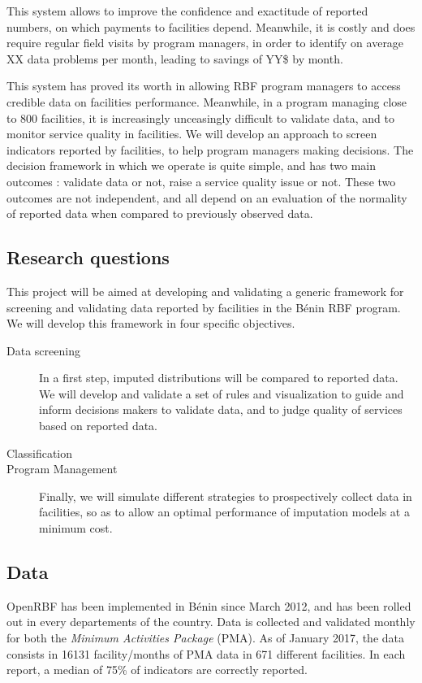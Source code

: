 This system allows to improve the confidence and exactitude of reported numbers, on which payments to facilities depend. Meanwhile, it is costly and does require regular field visits by program managers, in order to identify on average XX data problems per month, leading to savings of YY\$ by month.

This system has proved its worth in allowing RBF program managers to access credible data on facilities performance. Meanwhile, in a program managing close to 800 facilities, it is increasingly unceasingly difficult to validate data, and to monitor service quality in facilities. We will develop an approach to screen indicators reported by facilities, to help program managers making decisions. The decision framework in which we operate is quite simple, and has two main outcomes : validate data or not, raise a service quality issue or not. These two outcomes are not independent, and all depend on an evaluation of the normality of reported data when compared to previously observed data.

\subsection{Research questions}

This project will be aimed at developing and validating a generic framework for screening and validating data reported by facilities in the Bénin RBF program. We will develop this framework in four specific objectives.

\begin{description}
	\item[Data screening] In a first step, imputed distributions will be compared to reported data. We will develop and validate a set of rules and visualization to guide and inform decisions makers to validate data, and to judge quality of services based on reported data.
	\item[Classification]
	\item[Program Management] Finally, we will simulate different strategies to prospectively collect data in facilities, so as to allow an optimal performance of imputation models at a minimum cost.
\end{description}

\subsection{Data}
\label{paper2_data}

OpenRBF has been implemented in Bénin since March 2012, and has been rolled out in every departements of the country. Data is collected and validated monthly for both the \textit{Minimum Activities Package} (PMA). As of January 2017, the data consists in 16131 facility/months of PMA data in 671 different facilities. In each report, a median of 75\% of indicators are correctly reported.

